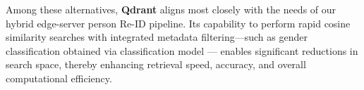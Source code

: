 \documentclass[../main.tex]{subfiles}
\begin{document}
Among these alternatives, \textbf{Qdrant} aligns most closely with the needs of our hybrid edge-server person Re-ID pipeline. Its capability to perform rapid cosine similarity searches with integrated metadata filtering—such as gender classification obtained via classification model — enables significant reductions in search space, thereby enhancing retrieval speed, accuracy, and overall computational efficiency.
\end{document}
